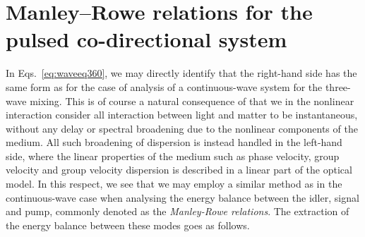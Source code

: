 \section{Manley--Rowe relations for the pulsed co-directional system}
In Eqs.~\eqref{eq:waveeq360}, we may directly identify that the right-hand side
has the same form as for the case of analysis of a continuous-wave system for
the three-wave mixing. This is of course a natural consequence of that we in
the nonlinear interaction consider all interaction between light and matter to
be instantaneous, without any delay or spectral broadening due to the nonlinear
components of the medium. All such broadening of dispersion is instead handled
in the left-hand side, where the linear properties of the medium such as phase
velocity, group velocity and group velocity dispersion is described in a linear
part of the optical model. In this respect, we see that we may employ a similar
method as in the continuous-wave case when analysing the energy balance between
the idler, signal and pump, commonly denoted as the {\it Manley-Rowe
relations}.
The extraction of the energy balance between these modes goes as follows.

